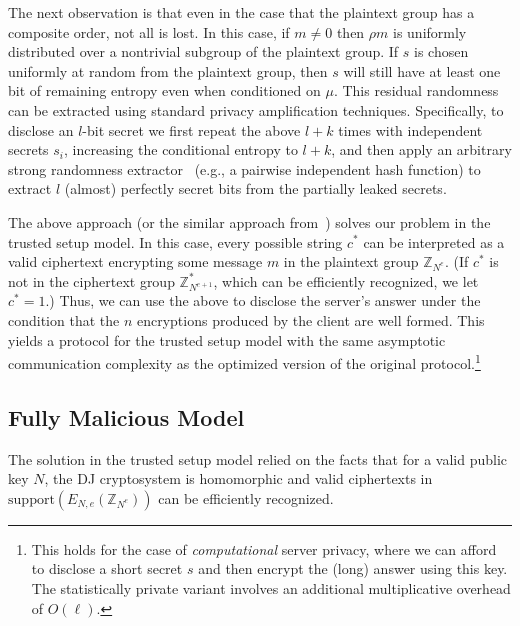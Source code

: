 \documentclass[11pt]{article}
\newcommand{\encdj}{{E}_{N,e}}
\newcommand{\Z}{\mathbb{Z}}
\newcommand{\support}{{\mathrm{support}}}
\begin{document}
The next observation is that even in the case that the plaintext
group has a composite order, not all is lost. In this case, if
$m\neq 0$ then $\rho m$ is uniformly distributed over a nontrivial
subgroup of the plaintext group. If $s$ is chosen uniformly at
random from the plaintext group, then $s$ will still have at least
one bit of remaining entropy even when conditioned on $\mu$. This
residual randomness can be extracted using standard privacy
amplification techniques. Specifically, to disclose an $l$-bit
secret we first repeat the above $l+k$ times with independent
secrets $s_i$, increasing the conditional entropy to $l+k$, and
then apply an arbitrary strong randomness extractor~\cite{NZ}
(e.g., a pairwise independent hash function\cite{BBR,ILL,BBCM}) to
extract $l$ (almost) perfectly secret bits from the partially
leaked secrets.

The above approach (or the similar approach from~\cite{L05}) solves
our problem in the trusted setup model. In this case, every
possible string $c^*$ can be interpreted as a valid ciphertext
encrypting some message $m$ in the plaintext group $\Z_{N^e}$.
(If $c^*$ is not in the ciphertext group $\Z^*_{N^{e+1}}$, which
can be efficiently recognized, we let $c^*=1$.) Thus, we can use
the above to disclose the server's answer under the condition that
the $n$ encryptions produced by the client are well formed. This
yields a protocol for the trusted setup model
with the same asymptotic communication complexity as the optimized
version of the original protocol.\footnote{This holds for the case
of {\em computational} server privacy, where we can afford to
disclose a short secret $s$ and then encrypt the (long) answer
using this key. The statistically private variant involves an
additional multiplicative overhead of $O(\ell)$. }

\subsection{Fully Malicious Model}
\label{sec-fullmalicious}

The solution in the trusted setup model relied on the facts that
for a valid public key $N$, the DJ cryptosystem is homomorphic and
valid ciphertexts in $\support(\encdj(\Z_{N^e}))$ can be
efficiently recognized.
\end{document}

